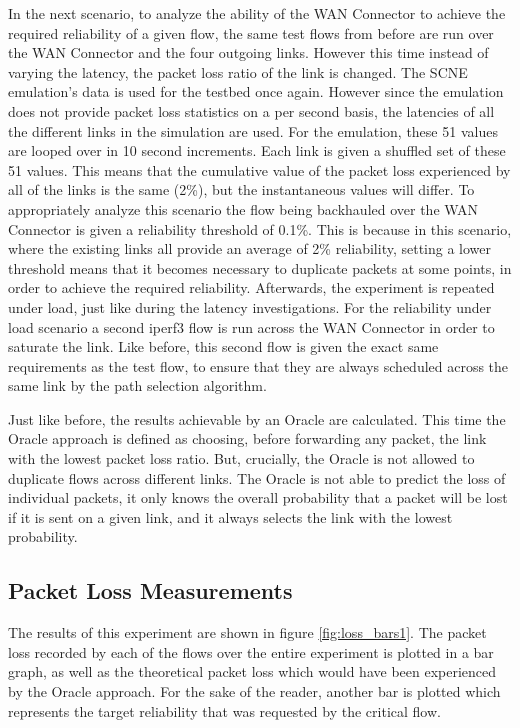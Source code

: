 In the next scenario, to analyze the ability of the WAN Connector to achieve the required reliability of a given flow, the same test flows from before are run over the WAN Connector and the four outgoing links. However this time instead of varying the latency, the packet loss ratio of the link is changed. The SCNE emulation's data is used for the testbed once again. However since the emulation does not provide packet loss statistics on a per second basis, the latencies of all the different links in the simulation are used. For the emulation, these 51 values are looped over in 10 second increments. Each link is given a shuffled set of these 51 values. This means that the cumulative value of the packet loss experienced by all of the links is the same (2\%), but the instantaneous values will differ. To appropriately analyze this scenario the flow being backhauled over the WAN Connector is given a reliability threshold of 0.1\%. This is because in this scenario, where the existing links all provide an average of 2\% reliability, setting a lower threshold means that it becomes necessary to duplicate packets at some points, in order to achieve the required reliability. Afterwards, the experiment is repeated under load, just like during the latency investigations. For the reliability under load scenario a second iperf3 flow is run across the WAN Connector in order to saturate the link. Like before, this second flow is given the exact same requirements as the test flow, to ensure that they are always scheduled across the same link by the path selection algorithm.

Just like before, the results achievable by an Oracle are calculated.  This time the Oracle approach is defined as choosing, before forwarding any packet, the link with the lowest packet loss ratio. But, crucially, the Oracle is not allowed to duplicate flows across different links. The Oracle is not able to predict the loss of individual packets, it only knows the overall probability that a packet will be lost if it is sent on a given link, and it always selects the link with the lowest probability.

\subsection{Packet Loss Measurements}

 The results of this experiment are shown in figure \ref{fig:loss_bars1}. The packet loss recorded by each of the flows over the entire experiment is plotted in a bar graph, as well as the theoretical packet loss which would have been experienced by the Oracle approach. For the sake of the reader, another bar is plotted which represents the target reliability that was requested by the critical flow.

